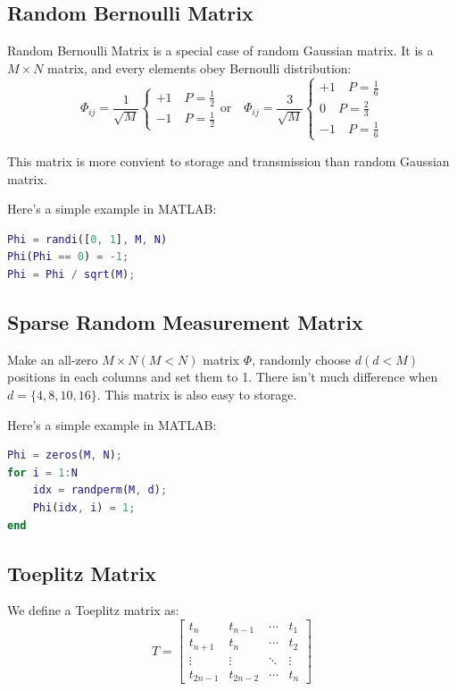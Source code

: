 \documentclass[10pt,a4paper,oneside,numbers=noenddot]{scrbook}
\theoremstyle{ctplain}
\theoremstyle{ctresult}
\begin{document}
\subsection{Random Bernoulli Matrix}

Random Bernoulli Matrix is a special case of random Gaussian matrix. It is a $M \times N$
matrix, and every elements obey Bernoulli distribution:
\[
  \Phi_{ij} = \frac{1}{\sqrt{M}}
  \begin{cases}
    +1 \quad P=\tfrac12 \\
    -1 \quad P=\tfrac12
  \end{cases}
  \text{or} \quad
  \Phi_{ij} = \frac{3}{\sqrt{M}}
  \begin{cases}
    +1 \quad P=\tfrac16 \\
    0 \quad P=\tfrac23 \\
    -1 \quad P=\tfrac16
  \end{cases}
\]

This matrix is more convient to storage and transmission than random Gaussian matrix.

Here's a simple example in MATLAB:

\begin{lstlisting}[language=Matlab]
%% Random Bernoulli Matrix Example
Phi = randi([0, 1], M, N)
Phi(Phi == 0) = -1;
Phi = Phi / sqrt(M);
\end{lstlisting}

\subsection{Sparse Random Measurement Matrix}

Make an all-zero $M \times N (M < N)$ matrix $\Phi$, randomly choose $d (d < M)$ positions in each
columns and set them to 1. There isn't much difference when $d = \{4, 8, 10, 16\}$. This matrix
is also easy to storage.

Here's a simple example in MATLAB:

\begin{lstlisting}[language=Matlab]
%% Sparse Random Measurement Matrix Example
Phi = zeros(M, N);
for i = 1:N
    idx = randperm(M, d);
    Phi(idx, i) = 1;
end
\end{lstlisting}

\subsection{Toeplitz Matrix}

We define a Toeplitz matrix as:
\[
  T = \begin{bmatrix}
    t_n & t_{n-1} & \cdots & t_1 \\
    t_{n+1} & t_n & \cdots & t_2 \\
    \vdots & \vdots & \ddots & \vdots \\
    t_{2n-1} & t_{2n-2} & \cdots & t_n
  \end{bmatrix}
\]
\end{document}
